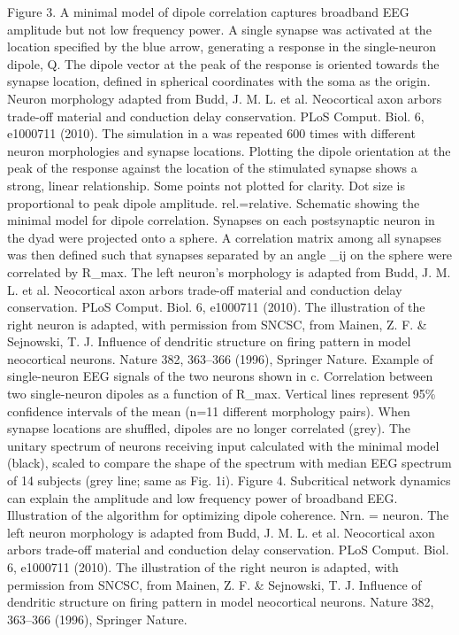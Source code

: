 Figure 3. A minimal model of dipole correlation captures broadband EEG amplitude but not low frequency power.
	A single synapse was activated at the location specified by the blue arrow, generating a response in the single-neuron dipole, Q. The dipole vector at the peak of the response is oriented towards the synapse location, defined in spherical coordinates with the soma as the origin. Neuron morphology adapted from Budd, J. M. L. et al. Neocortical axon arbors trade-off material and conduction delay conservation. PLoS Comput. Biol. 6, e1000711 (2010).
	The simulation in a was repeated 600 times with different neuron morphologies and synapse locations. Plotting the dipole orientation at the peak of the response against the location of the stimulated synapse shows a strong, linear relationship. Some points not plotted for clarity. Dot size is proportional to peak dipole amplitude. rel.=relative. 
	Schematic showing the minimal model for dipole correlation. Synapses on each postsynaptic neuron in the dyad were projected onto a sphere. A correlation matrix among all synapses was then defined such that synapses separated by an angle \theta_{ij} on the sphere were correlated by R_{max}. The left neuron’s morphology is adapted from Budd, J. M. L. et al. Neocortical axon arbors trade-off material and conduction delay conservation. PLoS Comput. Biol. 6, e1000711 (2010). The illustration of the right neuron is adapted, with permission from SNCSC, from Mainen, Z. F. & Sejnowski, T. J. Influence of dendritic structure on firing pattern in model neocortical neurons. Nature 382, 363–366 (1996), Springer Nature.
	Example of single-neuron EEG signals of the two neurons shown in c.
	Correlation between two single-neuron dipoles as a function of R_{max}. Vertical lines represent 95\% confidence intervals of the mean (n=11 different morphology pairs). When synapse locations are shuffled, dipoles are no longer correlated (grey).
	The unitary spectrum of neurons receiving input calculated with the minimal model (black), scaled to compare the shape of the spectrum with median EEG spectrum of 14 subjects (grey line; same as Fig. 1i).
Figure 4. Subcritical network dynamics can explain the amplitude and low frequency power of broadband EEG.
	Illustration of the algorithm for optimizing dipole coherence. Nrn. = neuron. The left neuron morphology is adapted from Budd, J. M. L. et al. Neocortical axon arbors trade-off material and conduction delay conservation. PLoS Comput. Biol. 6, e1000711 (2010). The illustration of the right neuron is adapted, with permission from SNCSC, from Mainen, Z. F. & Sejnowski, T. J. Influence of dendritic structure on firing pattern in model neocortical neurons. Nature 382, 363–366 (1996), Springer Nature.
